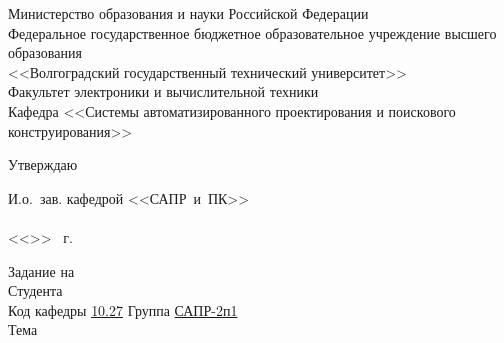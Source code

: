 \begin{titlepage}
    \begin{center}
        Министерство образования и науки Российской Федерации \\
        Федеральное государственное бюджетное образовательное учреждение высшего образования\\
        <<Волгоградский государственный технический университет>>\\
        Факультет электроники и вычислительной техники\\
        Кафедра <<Системы автоматизированного проектирования и поискового конструирования>>
    \end{center}
    \begin{flushright}
        \begin{center}
            \hspace*{9.7em}Утверждаю
        \end{center}
        И.о.~зав. кафедрой <<САПР~и~ПК>>\\
        \quad{}\\
        \vspace{.5em}<<\underline{\hspace{2em}}>> \underline{\hspace{8.5em}} \the\year\ г.
        \vspace{1em}
    \end{flushright}
    Задание на 
        {}\\
    Студента \\
    Код кафедры \vspace{1em}\underline{\hspace{2em}10.27\hspace{5em}}\quad\qquad
    Группа \underline{\hspace{3em}САПР-2п1\hspace{5em}}\\
    Тема \vspace{.5em}\underline{}\\

\end{titlepage}
